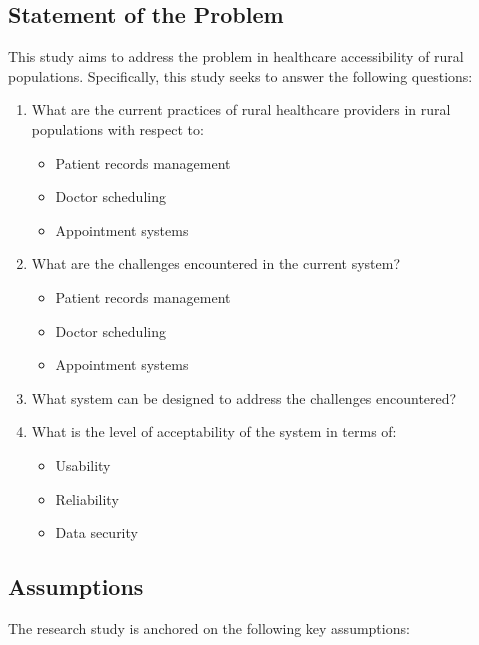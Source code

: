 \documentclass{research}
\begin{document}
\subsection*{Statement of the Problem}

This study aims to address the problem in healthcare accessibility of rural populations.
Specifically, this study seeks to answer the following questions:

\begin{enumerate}
  \item What are the current practices of rural healthcare providers in rural populations with
        respect to:
        \begin{itemize}
          \item Patient records management
          \item Doctor scheduling
          \item Appointment systems
        \end{itemize}
  \item What are the challenges encountered in the current system?
        \begin{itemize}
          \item Patient records management
          \item Doctor scheduling
          \item Appointment systems
        \end{itemize}
  \item What system can be designed to address the challenges encountered?
  \item What is the level of acceptability of the system in terms of:
        \begin{itemize}
          \item Usability
          \item Reliability
          \item Data security
        \end{itemize}
\end{enumerate}

\subsection*{Assumptions}

The research study is anchored on the following key assumptions:
\end{document}
